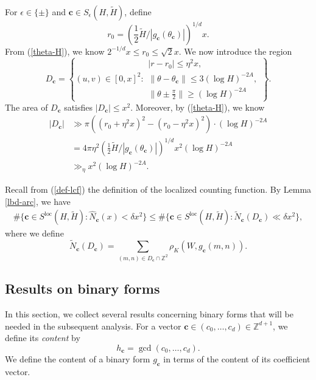 \documentclass[reqno, 11pt]{amsart}
\renewcommand{\leq}{\leqslant}
\renewcommand{\geq}{\geqslant}
\theoremstyle{definition}
\theoremstyle{definition}
\renewcommand{\geq}{\geqslant}
\renewcommand{\leq}{\leqslant}
\newcommand{\cc}{\mathbf{c}}
\newcommand{\ZZ}{\mathbb{Z}}
\numberwithin{equation}{section}
\begin{document}
For $\epsilon \in \{\pm\}$ and $\cc \in S_\epsilon(H, \tilde{H})$, define 
$$r_0 = \left(\frac{1}{2}\tilde{H}/|g_\cc(\theta_\cc)|\right)^{1/d} x.$$
From (\ref{theta-H}), we know $2^{-1/d} x \leq r_0 \leq \sqrt{2} x$.
We now introduce the region 
\begin{equation}\label{def-Dc}
D_\cc = \left\{(u, v) \in [0, x]^2 : 
\begin{array}{l}
|r - r_0| \leq \eta^2 x, \\
\|\theta - \theta_\cc\| \leq 3(\log H)^{-2A}, \\
\|\theta \pm \frac{\pi}{2}\| \geq (\log H)^{-2A}
\end{array} \right\}.
\end{equation}
The area of $D_\cc$ satisfies $|D_\cc| \leq x^2$. Moreover, by (\ref{theta-H}), we know
\begin{align}\label{bound-D}
	\nonumber |D_\cc| & \gg \pi \left((r_0 + \eta^2x)^2 - (r_0 - \eta^2x)^2 \right) \cdot (\log H)^{-2A} \\
	& = 4\pi \eta^2 \left(\frac{1}{2}\tilde{H}/|g_\cc(\theta_\cc)|\right)^{1/d} x^2(\log H)^{-2A} \\
	\nonumber & \gg_\eta x^2(\log H)^{-2A}.
\end{align}

Recall from (\ref{def-lcf}) the definition of the localized counting function. By Lemma \ref{lbd-arc}, we have
\begin{align}
	\#\{ \cc \in S^{\mathrm{loc}}(H, \tilde{H}): \hat{N}_\cc(x) < \delta x^2 \} \leq \#\{ \cc \in S^{\mathrm{loc}}(H, \tilde{H}): \tilde{N}_\cc(D_\cc) \ll \delta x^2 \},
\end{align}
where we define
$$\tilde{N}_\cc(D_\cc) = \sum_{(m, n) \in {D_\cc \cap \ZZ^2}} \rho_K(W, g_\cc(m,n)).$$





\subsection{Results on binary forms}

In this section, we collect several results concerning binary forms that will be needed in the subsequent analysis. For a vector $\cc \in (c_0, \dots, c_d) \in \ZZ^{d+1}$, we define its \emph{content} by 
$$h_\cc = \gcd(c_0, \dots, c_d).$$
We define the content of a binary form $g_\cc$ in terms of the content of its coefficient vector.
\end{document}
